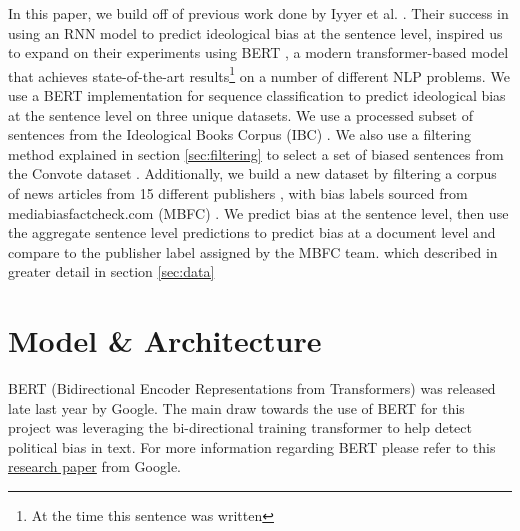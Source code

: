 \documentclass[10pt,a4paper,onecolumn]{article}
\begin{document}
In this paper, we build off of previous work done by Iyyer et al. \cite{iyyerRNN}. Their success in using an RNN model to predict ideological bias at the sentence level, inspired us to expand on their experiments using BERT \cite{bert}, a modern transformer-based model that achieves state-of-the-art results\footnote{At the time this sentence was written} on a number of different NLP problems. We use a BERT implementation for sequence classification to predict ideological bias at the sentence level on three unique datasets. We use a processed subset of sentences from the Ideological Books Corpus (IBC) \cite{gross2013ibc}. We also use a filtering method explained in section \ref{sec:filtering} to select a set of biased sentences from the Convote dataset \cite{convote}. Additionally, we build a new dataset by filtering a corpus of news articles from 15 different publishers \cite{news}, with bias labels sourced from mediabiasfactcheck.com (MBFC) \cite{mbfc}. We predict bias at the sentence level, then use the aggregate sentence level predictions to predict bias at a document level and compare to the publisher label assigned by the MBFC team. which  described in greater detail in section \ref{sec:data}

\section{Model \& Architecture}
BERT (Bidirectional Encoder Representations from Transformers) was released late last year by Google. The main draw towards the use of BERT for this project was leveraging the bi-directional training transformer to help detect political bias in text. For more information regarding BERT please refer to this \href{https://arxiv.org/abs/1810.04805}{research paper} from Google.
\end{document}
